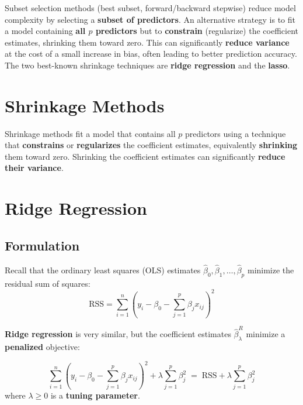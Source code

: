 \documentclass[11pt,a4paper]{article}
\theoremstyle{definition}
\theoremstyle{plain}
\theoremstyle{remark}
\begin{document}
Subset selection methods (best subset, forward/backward stepwise) reduce model complexity by selecting a \textbf{subset of predictors}. An alternative strategy is to fit a model containing \textbf{all $p$ predictors} but to \textbf{constrain} (regularize) the coefficient estimates, shrinking them toward zero. This can significantly \textbf{reduce variance} at the cost of a small increase in bias, often leading to better prediction accuracy. The two best-known shrinkage techniques are \textbf{ridge regression} and the \textbf{lasso}.

\section{Shrinkage Methods}

\begin{tcolorbox}[colback=blue!5!white,colframe=blue!75!black,title=\textbf{Shrinkage Methods}]
Shrinkage methods fit a model that contains all $p$ predictors using a technique that \textbf{constrains} or \textbf{regularizes} the coefficient estimates, equivalently \textbf{shrinking} them toward zero. Shrinking the coefficient estimates can significantly \textbf{reduce their variance}.
\end{tcolorbox}

\section{Ridge Regression}

\subsection{Formulation}

Recall that the ordinary least squares (OLS) estimates $\hat{\beta}_0, \hat{\beta}_1, \ldots, \hat{\beta}_p$ minimize the residual sum of squares:
\[
    \mathrm{RSS} = \sum_{i=1}^{n} \left(y_i - \beta_0 - \sum_{j=1}^{p} \beta_j x_{ij}\right)^{\!2}
\]

\textbf{Ridge regression} is very similar, but the coefficient estimates $\hat{\beta}^R_\lambda$ minimize a \textbf{penalized} objective:

\begin{tcolorbox}[colback=blue!5!white,colframe=blue!75!black,title=\textbf{Ridge Regression Objective}]
\[
    \sum_{i=1}^{n} \left(y_i - \beta_0 - \sum_{j=1}^{p} \beta_j x_{ij}\right)^{\!2} + \lambda \sum_{j=1}^{p} \beta_j^2
    \;=\; \mathrm{RSS} + \lambda \sum_{j=1}^{p} \beta_j^2
\]
where $\lambda \geq 0$ is a \textbf{tuning parameter}.
\end{tcolorbox}
\end{document}
